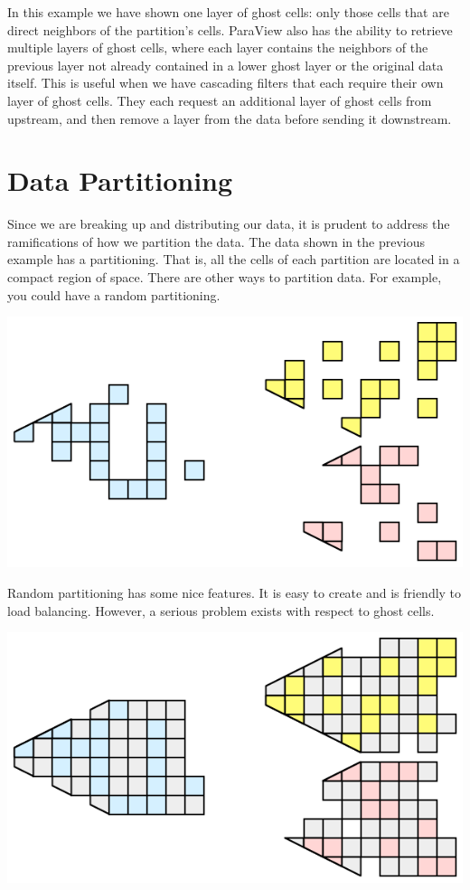In this example we have shown one layer of ghost cells: only those cells
that are direct neighbors of the partition’s cells.  ParaView also has the
ability to retrieve multiple layers of ghost cells, where each layer
contains the neighbors of the previous layer not already contained in a
lower ghost layer or the original data itself.  This is useful when we have
cascading filters that each require their own layer of ghost cells.  They
each request an additional layer of ghost cells from upstream, and then
remove a layer from the data before sending it downstream.

\section{Data Partitioning}

Since we are breaking up and distributing our data, it is prudent to
address the ramifications of how we partition the data.  The data shown in
the previous example has a  partitioning.  That
is, all the cells of each partition are located in a compact region of
space.  There are other ways to partition data.  For example, you could
have a random partitioning.

\begin{inlinefig}
  \includegraphics{images/ParallelExampleRandomPartition1}
\end{inlinefig}

Random partitioning has some nice features.  It is easy to create and is
friendly to load balancing.  However, a serious problem exists with respect
to ghost cells.

\begin{inlinefig}
  \includegraphics{images/ParallelExampleRandomPartition2}
\end{inlinefig}

